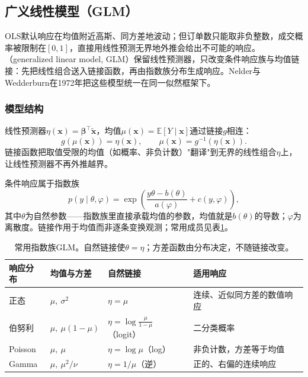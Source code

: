 \subsection{广义线性模型（GLM）}
\label{sec:regression-glm}

OLS默认响应在均值附近高斯、同方差地波动；但订单数只能取非负整数，成交概率被限制在$[0,1]$，直接用线性预测无界地外推会给出不可能的响应。（generalized linear model, GLM）保留线性预测器，只改变条件响应族与均值链接：先把线性组合送入链接函数，再由指数族分布生成响应。Nelder与Wedderburn在1972年把这些模型统一在同一似然框架下。

\subsubsection{模型结构}
\label{sec:regression-glm-structure}

线性预测器$\eta(\bm{x})=\bm{\beta}^{\top}\tilde{\bm{x}}$，均值$\mu(\bm{x})=\mathbb E[Y\mid\bm{x}]$通过链接$g$相连：
\[
  g(\mu(\bm{x}))=\eta(\bm{x}),\qquad \mu(\bm{x})=g^{-1}(\eta(\bm{x})).
\]
链接函数把取值受限的均值（如概率、非负计数）"翻译"到无界的线性组合$\eta$上，让线性预测器不再外推越界。

条件响应属于指数族
\begin{equation}
  p(y\mid\theta,\varphi)
  =\exp\left(\frac{y\theta-b(\theta)}{a(\varphi)}+c(y,\varphi)\right),
  \label{eq:regression-exponential-family}
\end{equation}
其中$\theta$为自然参数——指数族里直接承载均值的参数，均值就是$b(\theta)$的导数；$\varphi$为离散度。链接作用于均值而非逐条变换观测；常用成员见表\ref{tab:regression-glm}。

\begin{table}[t]
  \centering
  \small
  \setlength{\tabcolsep}{4pt}
  \renewcommand{\arraystretch}{1.25}
  \begin{tabularx}{\linewidth}{@{}>{\RaggedRight\arraybackslash}p{20mm}>{\RaggedRight\arraybackslash}p{30mm}>{\RaggedRight\arraybackslash}p{30mm}>{\RaggedRight\arraybackslash}X@{}}
    \toprule
    响应分布 & 均值与方差 & 自然链接 & 适用响应 \\
    \midrule
    正态 & $\mu,\ \sigma^2$ & $\eta=\mu$ & 连续、近似同方差的数值响应 \\
    \addlinespace
    伯努利 & $\mu,\ \mu(1-\mu)$ & $\eta=\log\frac{\mu}{1-\mu}$（logit） & 二分类概率 \\
    \addlinespace
    Poisson & $\mu,\ \mu$ & $\eta=\log\mu$（log） & 非负计数，方差等于均值 \\
    \addlinespace
    Gamma & $\mu,\ \mu^2/\nu$ & $\eta=1/\mu$（逆） & 正的、右偏的连续响应 \\
    \bottomrule
  \end{tabularx}
  \caption{常用指数族GLM。自然链接使$\theta=\eta$；方差函数由分布决定，不随链接改变。}
  \label{tab:regression-glm}
\end{table}

